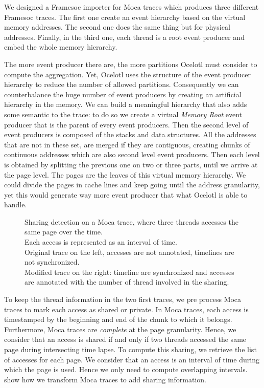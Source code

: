 We designed a \gls{Framesoc} importer for \gls{Moca} traces which produces three different \gls{Framesoc} traces.
The first one create an event hierarchy based on the virtual memory addresses.
The second one does the same thing but for physical addresses.
Finally, in the third one, each thread is a root event producer and embed the whole memory hierarchy.

The more event producer there are, the more partitions \gls{Ocelotl} must consider to compute the aggregation.
Yet, \gls{Ocelotl} uses the structure of the event producer hierarchy to reduce the number of allowed partitions.
Consequently we can counterbalance the huge number of event producers by creating an artificial hierarchy in the memory.
We can build a meaningful hierarchy that also adds some semantic to the trace: to do so we create a virtual \emph{Memory Root} event producer that is the parent of every event producers.
Then the second level of event producers is composed of the stacks and data structures.
All the addresses that are not in these set, are merged if they are contiguous, creating chunks of continuous addresses which are also second level event producers.
Then each level is obtained by splitting the previous one on two or three parts, until we arrive at the page level.
The pages are the leaves of this virtual memory hierarchy.
We could divide the pages in cache lines and keep going until the address granularity, yet this would generate way more event producer that what \gls{Ocelotl} is able to handle.

\begin{figure}[htb]
    \centering
    
    \caption[Sharing detection on Moca traces.]{
        Sharing detection on a Moca trace, where three threads accesses the same page over the time.\\
        Each access is represented as an interval of time.\\
        Original trace on the left, accesses are not annotated, timelines are not synchronized.\\
        Modified trace on the right: timeline are synchronized and accesses are annotated with the number of thread involved in the sharing.
    }
    \label{fig:sharing-detection}
\end{figure}

To keep the thread information in the two first traces, we pre process \gls{Moca} traces to mark each access as shared or private.
In \gls{Moca} traces, each access is timestamped by the beginning and end of the chunk to which it belongs.
Furthermore, \gls{Moca} traces are \emph{complete} at the page granularity.
Hence, we consider that an access is shared if and only if two threads accessed the same page during intersecting time lapse.
To compute this sharing, we retrieve the list of accesses for each page.
We consider that an access is an interval of time during which the page is used.
Hence we only need to compute overlapping intervals.
 show how we transform \gls{Moca} traces to add sharing information.

